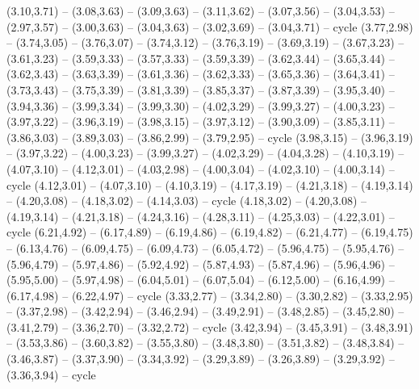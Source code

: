 \expandafter\def\csname geo:gebiet:SLV\endcsname{
  }
\expandafter\def\csname geo:gebiet:GTM\endcsname{
  (3.10,3.71) -- (3.08,3.63) -- (3.09,3.63) -- (3.11,3.62) -- (3.07,3.56) -- (3.04,3.53) -- (2.97,3.57) -- (3.00,3.63) -- (3.04,3.63) -- (3.02,3.69) -- (3.04,3.71) -- cycle}
\expandafter\def\csname geo:gebiet:BLZ\endcsname{
  }
\expandafter\def\csname geo:gebiet:VEN\endcsname{
  (3.77,2.98) -- (3.74,3.05) -- (3.76,3.07) -- (3.74,3.12) -- (3.76,3.19) -- (3.69,3.19) -- (3.67,3.23) -- (3.61,3.23) -- (3.59,3.33) -- (3.57,3.33) -- (3.59,3.39) -- (3.62,3.44) -- (3.65,3.44) -- (3.62,3.43) -- (3.63,3.39) -- (3.61,3.36) -- (3.62,3.33) -- (3.65,3.36) -- (3.64,3.41) -- (3.73,3.43) -- (3.75,3.39) -- (3.81,3.39) -- (3.85,3.37) -- (3.87,3.39) -- (3.95,3.40) -- (3.94,3.36) -- (3.99,3.34) -- (3.99,3.30) -- (4.02,3.29) -- (3.99,3.27) -- (4.00,3.23) -- (3.97,3.22) -- (3.96,3.19) -- (3.98,3.15) -- (3.97,3.12) -- (3.90,3.09) -- (3.85,3.11) -- (3.86,3.03) -- (3.89,3.03) -- (3.86,2.99) -- (3.79,2.95) -- cycle}
\expandafter\def\csname geo:gebiet:GUY\endcsname{
  (3.98,3.15) -- (3.96,3.19) -- (3.97,3.22) -- (4.00,3.23) -- (3.99,3.27) -- (4.02,3.29) -- (4.04,3.28) -- (4.10,3.19) -- (4.07,3.10) -- (4.12,3.01) -- (4.03,2.98) -- (4.00,3.04) -- (4.02,3.10) -- (4.00,3.14) -- cycle}
\expandafter\def\csname geo:gebiet:SUR\endcsname{
  (4.12,3.01) -- (4.07,3.10) -- (4.10,3.19) -- (4.17,3.19) -- (4.21,3.18) -- (4.19,3.14) -- (4.20,3.08) -- (4.18,3.02) -- (4.14,3.03) -- cycle}
\expandafter\def\csname geo:gebiet:FRA\endcsname{
  (4.18,3.02) -- (4.20,3.08) -- (4.19,3.14) -- (4.21,3.18) -- (4.24,3.16) -- (4.28,3.11) -- (4.25,3.03) -- (4.22,3.01) -- cycle
  (6.21,4.92) -- (6.17,4.89) -- (6.19,4.86) -- (6.19,4.82) -- (6.21,4.77) -- (6.19,4.75) -- (6.13,4.76) -- (6.09,4.75) -- (6.09,4.73) -- (6.05,4.72) -- (5.96,4.75) -- (5.95,4.76) -- (5.96,4.79) -- (5.97,4.86) -- (5.92,4.92) -- (5.87,4.93) -- (5.87,4.96) -- (5.96,4.96) -- (5.95,5.00) -- (5.97,4.98) -- (6.04,5.01) -- (6.07,5.04) -- (6.12,5.00) -- (6.16,4.99) -- (6.17,4.98) -- (6.22,4.97) -- cycle}
\expandafter\def\csname geo:gebiet:ECU\endcsname{
  (3.33,2.77) -- (3.34,2.80) -- (3.30,2.82) -- (3.33,2.95) -- (3.37,2.98) -- (3.42,2.94) -- (3.46,2.94) -- (3.49,2.91) -- (3.48,2.85) -- (3.45,2.80) -- (3.41,2.79) -- (3.36,2.70) -- (3.32,2.72) -- cycle}
\expandafter\def\csname geo:gebiet:PRI\endcsname{
  }
\expandafter\def\csname geo:gebiet:JAM\endcsname{
  }
\expandafter\def\csname geo:gebiet:CUB\endcsname{
  (3.42,3.94) -- (3.45,3.91) -- (3.48,3.91) -- (3.53,3.86) -- (3.60,3.82) -- (3.55,3.80) -- (3.48,3.80) -- (3.51,3.82) -- (3.48,3.84) -- (3.46,3.87) -- (3.37,3.90) -- (3.34,3.92) -- (3.29,3.89) -- (3.26,3.89) -- (3.29,3.92) -- (3.36,3.94) -- cycle}
